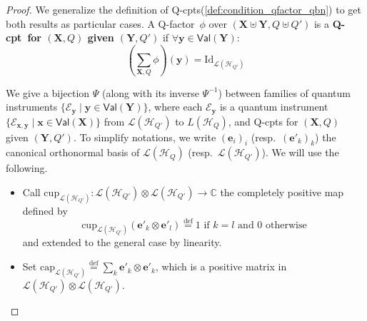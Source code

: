 \documentclass[10pt,a4paper]{article}
\newcommand*{\resp}{resp.}
\newcommand*{\eg}{\emph{e.g.}\xspace}
\newcommand{\textdef}[1]{\textbf{#1}}
\newcommand*{\defeq}{\stackrel{\text{def}}{=}}
\newcommand*{\tens}{\otimes}
\newcommand*{\setofrv}[1]{\mathsf{Val}(#1)}
\newcommand{\bX}{\mathbf X}
\newcommand{\bY}{\mathbf Y}
\newcommand{\bx}{{\mathbf x}}
\newcommand{\by}{{\mathbf y}}
\newcommand{\be}{{\mathbf e}}
\newcommand{\tr}[1]{\mathrm{tr}\left(#1\right)}
\renewcommand{\L}{\mathcal{L}}
\newcommand{\Eop}{\mathcal E}
\newcommand*{\baseof}[1]{\textsf{Basis}_{#1}}
\newcommand*{\C}{\mathbb{C}}
\newcommand{\HH}{\mathcal{H}}
\newcommand{\qfactfunc}[1]{\widehat{#1}}
\newcommand{\reg}{Q}
\newcommand{\qreg}{\reg}
\newcommand*{\someqfact}{\phi}
\newcommand*{\id}[1][]{\mathrm{Id}_{#1}}
\newcommand*{\qcup}[1][]{\mathrm{cup}_{#1}}
\newcommand*{\qcap}[1][]{\mathrm{cap}_{#1}}
\newcommand*{\qfactor}{Q-factor}
\newcommand*{\qCPT}{Q-\textsf{cpt}\xspace}
\newcommand*{\qCPTs}{Q-\textsf{cpt}s\xspace}
\begin{document}
\begin{proof}
We generalize the definition of \qCPTs (\cref{def:condition_qfactor_qbn}) to get both results as particular cases.
A \qfactor\ $\someqfact$ over $(\bX\uplus\bY,\qreg\uplus\qreg')$ is a \textdef{\qCPT\ for $(\bX,\qreg)$ given $(\bY, \qreg')$} if $\forall \by\in\setofrv{\bY}$:
\begin{equation*}
\left(\sum_{\bX,\qreg} \someqfact\right)(\by)
=
\id[\L(\HH_{\qreg'})]
\end{equation*}

We give a bijection $\Psi$ (along with its inverse $\Psi^{-1}$) between families of quantum instruments $\{\Eop_\by \mid \by\in\setofrv{\bY}\}$, where each $\Eop_\by$ is a quantum instrument $\{\Eop_{\bx,\by} \mid \bx\in\setofrv{\bX}\}$ from $\L(\HH_{\qreg'})$ to $L(\HH_\qreg)$, and \qCPTs for $(\bX,\qreg)$ given $(\bY, \qreg')$.
To simplify notations, we write $(\be_i)_{i}$ (\resp\ $(\be'_k)_{k}$) the canonical orthonormal basis of $\L(\HH_{\qreg})$ (\resp\ $\L(\HH_{\qreg'})$).
We will use the following.
\begin{itemize}
\item
Call $\qcup[\L(\HH_{\qreg'})]:\L(\HH_{\qreg'})\tens\L(\HH_{\qreg'})\to\C$ the completely positive map defined by
\begin{equation*}
\qcup[\L(\HH_{\qreg'})](\be'_k \tens \be'_l) \defeq 1 \text{ if } k=l \text{ and } 0 \text{ otherwise}
\end{equation*}
and extended to the general case by linearity.
\item
Set $\qcap[\L(\HH_{\qreg'})]\defeq \sum_k \be'_k\tens \be'_k$, which is a positive matrix in $\L(\HH_{\qreg'})\tens\L(\HH_{\qreg'})$.
\end{itemize}


\end{proof}
\end{document}
